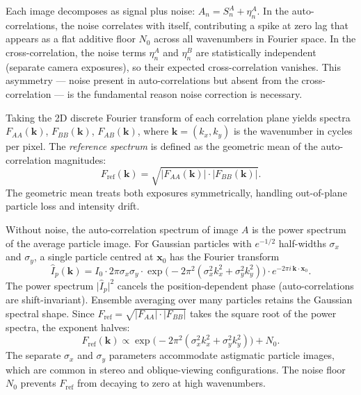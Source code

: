 \documentclass[11pt,a4paper]{article}
\newcommand{\kv}{\mathbf{k}}
\newcommand{\xv}{\mathbf{x}}
\newcommand{\Fref}{F_\mathrm{ref}}
\begin{document}
Each image decomposes as signal plus noise: $A_n = S_n^A + \eta_n^A$.
In the auto-correlations, the noise correlates with itself, contributing a spike at zero lag that appears as a flat additive floor $N_0$ across all wavenumbers in Fourier space.
In the cross-correlation, the noise terms $\eta_n^A$ and $\eta_n^B$ are statistically independent (separate camera exposures), so their expected cross-correlation vanishes.
This asymmetry --- noise present in auto-correlations but absent from the cross-correlation --- is the fundamental reason noise correction is necessary.

Taking the 2D discrete Fourier transform of each correlation plane yields spectra $F_{AA}(\kv)$, $F_{BB}(\kv)$, $F_{AB}(\kv)$, where $\kv = (k_x, k_y)$ is the wavenumber in cycles per pixel.
The \emph{reference spectrum} is defined as the geometric mean of the auto-correlation magnitudes:
%
\begin{equation}
    \Fref(\kv) = \sqrt{\lvert F_{AA}(\kv)\rvert \cdot \lvert F_{BB}(\kv)\rvert}.
    \label{eq:fref}
\end{equation}
%
The geometric mean treats both exposures symmetrically, handling out-of-plane particle loss and intensity drift.

Without noise, the auto-correlation spectrum of image $A$ is the power spectrum of the average particle image.
For Gaussian particles with $e^{-1/2}$ half-widths $\sigma_x$ and $\sigma_y$, a single particle centred at $\xv_0$ has the Fourier transform
%
\begin{equation}
    \hat{I}_p(\kv) = I_0 \cdot 2\pi\sigma_x\sigma_y \cdot
    \exp\!\bigl(-2\pi^2(\sigma_x^2 k_x^2 + \sigma_y^2 k_y^2)\bigr)
    \cdot e^{-2\pi i\, \kv\cdot\xv_0}.
    \label{eq:ft_particle}
\end{equation}
%
The power spectrum $\lvert\hat{I}_p\rvert^2$ cancels the position-dependent phase (auto-correlations are shift-invariant).
Ensemble averaging over many particles retains the Gaussian spectral shape.
Since $\Fref = \sqrt{\lvert F_{AA}\rvert \cdot \lvert F_{BB}\rvert}$ takes the square root of the power spectra, the exponent halves:
%
\begin{equation}
    \Fref(\kv) \propto \exp\!\bigl(-2\pi^2(\sigma_x^2 k_x^2 + \sigma_y^2 k_y^2)\bigr) + N_0.
    \label{eq:fref_content}
\end{equation}
%
The separate $\sigma_x$ and $\sigma_y$ parameters accommodate astigmatic particle images, which are common in stereo and oblique-viewing configurations.
The noise floor $N_0$ prevents $\Fref$ from decaying to zero at high wavenumbers.
\end{document}
